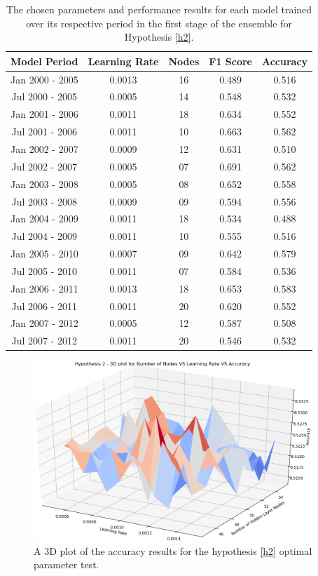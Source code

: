 \documentclass{UoYCSproject}
\begin{document}
\begin{table}[h]
    \centering
    \begin{tabular}{|c|c|c|c|c|} \hline
        \textbf{Model Period} & \textbf{Learning Rate} & \textbf{Nodes} & \textbf{F1 Score} & \textbf{Accuracy} \\ \hline
        Jan 2000 - 2005 & 0.0013 & 16 & 0.489 & 0.516 \\
        Jul 2000 - 2005 & 0.0005 & 14 & 0.548 & 0.532 \\
        Jan 2001 - 2006 & 0.0011 & 18 & 0.634 & 0.552 \\
        Jul 2001 - 2006 & 0.0011 & 10 & 0.663 & 0.562 \\
        Jan 2002 - 2007 & 0.0009 & 12 & 0.631 & 0.510 \\
        Jul 2002 - 2007 & 0.0005 & 07 & 0.691 & 0.562 \\
        Jan 2003 - 2008 & 0.0005 & 08 & 0.652 & 0.558 \\
        Jul 2003 - 2008 & 0.0009 & 09 & 0.594 & 0.556 \\
        Jan 2004 - 2009 & 0.0011 & 18 & 0.534 & 0.488 \\
        Jul 2004 - 2009 & 0.0011 & 10 & 0.555 & 0.516 \\
        Jan 2005 - 2010 & 0.0007 & 09 & 0.642 & 0.579 \\
        Jul 2005 - 2010 & 0.0011 & 07 & 0.584 & 0.536 \\
        Jan 2006 - 2011 & 0.0013 & 18 & 0.653 & 0.583 \\
        Jul 2006 - 2011 & 0.0011 & 20 & 0.620 & 0.552 \\
        Jan 2007 - 2012 & 0.0005 & 12 & 0.587 & 0.508 \\
        Jul 2007 - 2012 & 0.0011 & 20 & 0.546 & 0.532 \\
        \hline
    \end{tabular}
    \caption{The chosen parameters and performance results for each model trained over its respective period in the first stage of the ensemble for Hypothesis \ref{h2}.}
    \label{tab:h2_stage1}
\end{table}

\begin{figure}[h]
\includegraphics[width=10.5cm]{h2_accuracy.png}
\centering
\caption{A 3D plot of the accuracy results for the hypothesis \ref{h2} optimal parameter test.} 
\label{fig:h2_plot_accuracy}
\end{figure}
\end{document}
